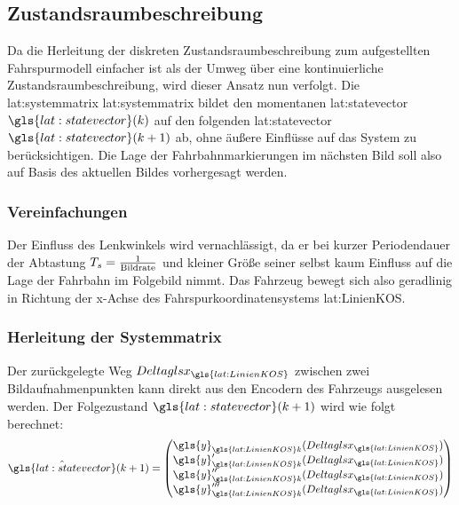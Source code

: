 \subsection{Zustandsraumbeschreibung}
Da die Herleitung der diskreten Zustandsraumbeschreibung zum aufgestellten Fahrspurmodell einfacher ist als der Umweg über eine kontinuierliche Zustandsraumbeschreibung, wird dieser Ansatz nun verfolgt.
Die \glsdesc{lat:systemmatrix} \gls{lat:systemmatrix} bildet den momentanen \glsdesc{lat:statevector} \(\gls{lat:statevector}(\scl{k})\) auf den folgenden \glsdesc{lat:statevector} \(\gls{lat:statevector}(\scl{k}+1)\) ab, ohne äußere Einflüsse auf das System zu berücksichtigen. Die Lage der Fahrbahnmarkierungen im nächsten Bild soll also auf Basis des aktuellen Bildes vorhergesagt werden.

\subsubsection{Vereinfachungen}
Der Einfluss des Lenkwinkels wird vernachlässigt, da er bei kurzer Periodendauer der Abtastung \(T_s = \frac{1}{\text{Bildrate}}\) und kleiner Größe seiner selbst kaum Einfluss auf die Lage der Fahrbahn im Folgebild nimmt. Das Fahrzeug bewegt sich also geradlinig in Richtung der x-Achse des Fahrspurkoordinatensystems \gls{lat:LinienKOS}. 

\subsubsection{Herleitung der Systemmatrix}
Der zurückgelegte Weg \begin{math} \scl{Deltagls{x}}_{\gls{lat:LinienKOS}} \end{math} zwischen zwei Bildaufnahmenpunkten kann direkt aus den Encodern des Fahrzeugs ausgelesen werden. Der Folgezustand  \(\gls{lat:statevector}(\scl{k}+1)\) wird wie folgt berechnet:
\begin{equation}
\label{eq:nextstatemapping}
\hat{\gls{lat:statevector}}(\scl{k}+1) =
\begin{pmatrix}
\gls{y}_{\gls{lat:LinienKOS}\scl{k}}(\scl{Deltagls{x}}_{\gls{lat:LinienKOS}}) \\
\der{\gls{y}_{\gls{lat:LinienKOS}\scl{k}}}(\scl{Deltagls{x}}_{\gls{lat:LinienKOS}}) \\
\derII{\gls{y}_{\gls{lat:LinienKOS}\scl{k}}}(\scl{Deltagls{x}}_{\gls{lat:LinienKOS}}) \\
\derIII{\gls{y}_{\gls{lat:LinienKOS}\scl{k}}}(\scl{Deltagls{x}}_{\gls{lat:LinienKOS}}) \\
\end{pmatrix}
\end{equation}

